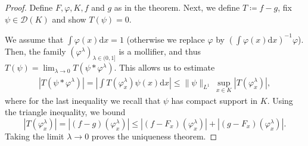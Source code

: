 \begin{proof}
    Define $F, \varphi, K, f$ and $g$ as in the theorem. Next, we define $T \coloneqq f - g$, fix $\psi \in \mathcal{D}(K)$ and show $T(\psi) = 0$.
   
    We assume that $\int \varphi(x) \mathrm{d} x = 1$ (otherwise we replace $\varphi$ by $(\int \varphi(x) \mathrm{d}x)^{-1}\varphi$). Then, the family $(\varphi^\lambda)_{\lambda \in (0,1]}$ is a mollifier, and thus $T(\psi) = \lim_{\lambda \to 0}T(\psi * \varphi^\lambda)$. This allows us to estimate 
    \begin{align*}
        |T(\psi * \varphi^\lambda)| = \left|\int T(\varphi^\lambda_x) \psi(x) \mathrm{d}x\right| \leq \lVert \psi \rVert_{L^1} \, \sup_{x \in K}|T(\varphi^\lambda_x)|,
    \end{align*}
    where for the last inequality we recall that $\psi$ has compact support in $K$. Using the triangle inequality, we bound 
    $$
        |T(\varphi^\lambda_x)| = |(f-g)(\varphi^\lambda_x)| \leq |(f-F_x)(\varphi^\lambda_x)| + |(g-F_x)(\varphi^\lambda_x)|.
    $$ 
    Taking the limit $\lambda \to 0$ proves the uniqueness theorem. 
\end{proof}
